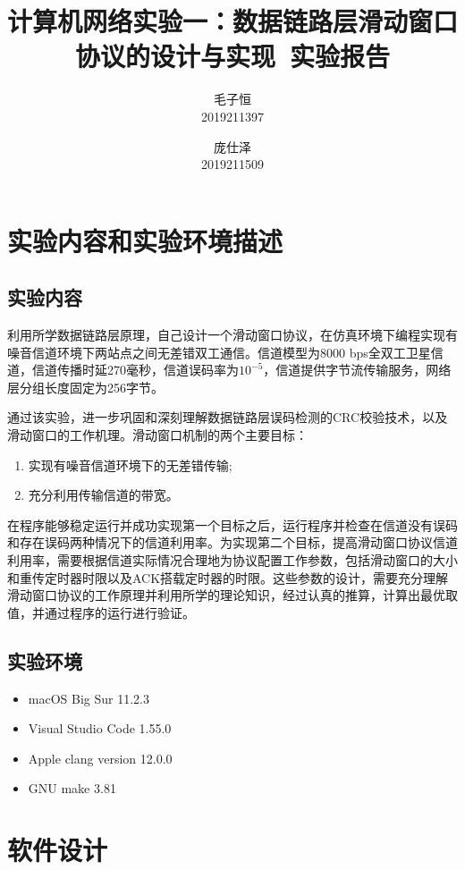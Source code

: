 \documentclass[lang=cn,11pt,a4paper,cite=authornum]{paper}
\title{计算机网络实验一：数据链路层滑动窗口协议的设计与实现\ 实验报告}
\author{毛子恒 \\ 2019211397 \and 庞仕泽 \\ 2019211509}
\institute{北京邮电大学\ 计算机学院}
\date{\zhtoday}
\begin{document}
\maketitle

\section{实验内容和实验环境描述}

\subsection{实验内容}

利用所学数据链路层原理，自己设计一个滑动窗口协议，在仿真环境下编程实现有噪音信道环境下两站点之间无差错双工通信。信道模型为8000 bps全双工卫星信道，信道传播时延270毫秒，信道误码率为$10^{-5}$，信道提供字节流传输服务，网络层分组长度固定为256字节。

通过该实验，进一步巩固和深刻理解数据链路层误码检测的CRC校验技术，以及滑动窗口的工作机理。滑动窗口机制的两个主要目标：

\begin{enumerate}
    \item 实现有噪音信道环境下的无差错传输;
    \item 充分利用传输信道的带宽。
\end{enumerate}

在程序能够稳定运行并成功实现第一个目标之后，运行程序并检查在信道没有误码和存在误码两种情况下的信道利用率。为实现第二个目标，提高滑动窗口协议信道利用率，需要根据信道实际情况合理地为协议配置工作参数，包括滑动窗口的大小和重传定时器时限以及ACK搭载定时器的时限。这些参数的设计，需要充分理解滑动窗口协议的工作原理并利用所学的理论知识，经过认真的推算，计算出最优取值，并通过程序的运行进行验证。

\subsection{实验环境}

\begin{itemize}
    \item macOS Big Sur 11.2.3
    \item Visual Studio Code 1.55.0
    \item Apple clang version 12.0.0
    \item GNU make 3.81
\end{itemize}

\section{软件设计}
\end{document}
